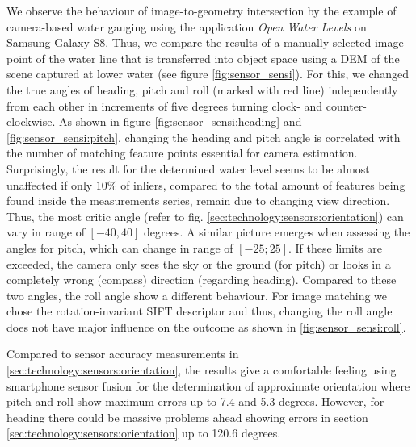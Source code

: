 \documentclass[review]{elsarticle}
\begin{document}
We observe the behaviour of image-to-geometry intersection by the example of camera-based water gauging using the application \textit{Open Water Levels} on Samsung Galaxy S8. Thus, we compare the results of a manually selected image point of the water line that is transferred into object space using a \gls{DEM} of the scene captured at lower water (see figure \ref{fig:sensor_sensi}). For this, we changed the true angles of heading, pitch and roll (marked with red line) independently from each other in increments of five degrees turning clock- and counter-clockwise.
As shown in figure \ref{fig:sensor_sensi:heading} and \ref{fig:sensor_sensi:pitch}, changing the heading and pitch angle is correlated with the number of matching feature points essential for camera estimation. Surprisingly, the result for the determined water level seems to be almost unaffected if only $10\%$ of inliers, compared to the total amount of features being found inside the measurements series, remain due to changing view direction. Thus, the most critic angle (refer to fig. \ref{sec:technology:sensors:orientation}) can vary in range of $[-40,40]$ degrees. A similar picture emerges when assessing the angles for pitch, which can change in range of $[-25;25]$. If these limits are exceeded, the camera only sees the sky or the ground (for pitch) or looks in a completely wrong (compass) direction (regarding heading). Compared to these two angles, the roll angle show a different behaviour. For image matching we chose the rotation-invariant \gls{SIFT} descriptor \cite{Lowe2004} and thus, changing the roll angle does not have major influence on the outcome as shown in \ref{fig:sensor_sensi:roll}.

Compared to sensor accuracy measurements in \ref{sec:technology:sensors:orientation}, the results give a comfortable feeling using smartphone sensor fusion for the determination of approximate orientation where pitch and roll show maximum errors up to 7.4 and 5.3 degrees. However, for heading there could be massive problems ahead showing errors in section \ref{sec:technology:sensors:orientation} up to 120.6 degrees.
\end{document}
